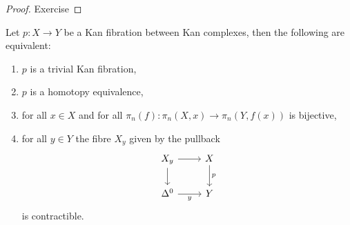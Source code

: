 \begin{proof}
    Exercise
\end{proof}

\begin{prop}
    Let $p\colon X \to Y$ be a Kan fibration between Kan complexes, then the following are equivalent:
    \begin{enumerate}
        \item 
        $p$ is a trivial Kan fibration,
        \item 
        $p$ is a homotopy equivalence,
        \item 
        for all $x \in X$ and for all $\pi_n(f)\colon \pi_n(X,x) \to \pi_n(Y,f(x))$ is bijective,
        \item 
        for all $y \in Y$ the fibre $X_y$ given by the pullback 
        \[
        \begin{tikzcd}
            X_y
            \ar[r]
            \ar[d]
            &
            X
            \ar[d,"p"]
            \\
            \Delta^0
            \ar[r,"y"']
            &
            Y
        \end{tikzcd}
        \]
        is contractible.
    \end{enumerate}
\end{prop}

